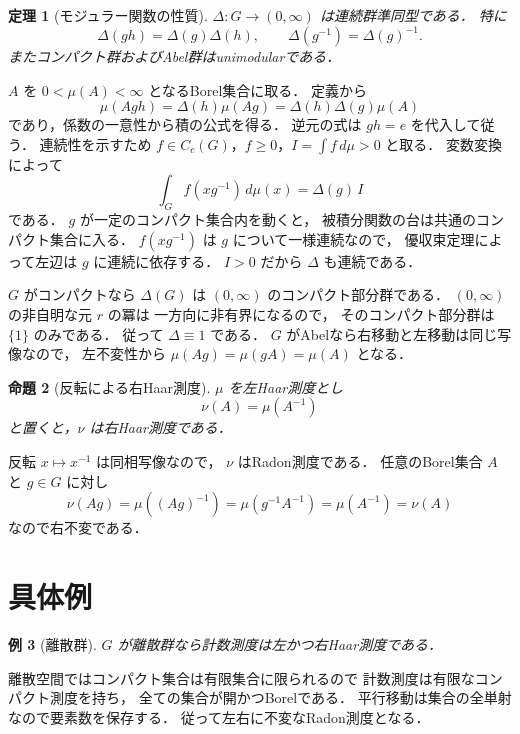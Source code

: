 \documentclass[a5paper,10pt,onecolumn]{jsarticle}
\makeatletter
\theoremstyle{mathnotetheorem}
\newtheorem{theorem}{定理}[section]
\newtheorem{proposition}[theorem]{命題}
\newtheorem{example}[theorem]{例}
\renewcommand{\proofname}{証明}
\renewenvironment{proof}[1][\proofname]{%
  \par\pushQED{\qed}\normalfont\topsep4\p@\@plus2\p@\relax
  \trivlist\item[\hskip\labelsep\bfseries #1]\ignorespaces
}{\popQED\endtrivlist\@endpefalse}
\makeatother
\begin{document}
\begin{theorem}[モジュラー関数の性質]\label{thm:modular}
$\Delta:G\to(0,\infty)$ は連続群準同型である．
特に
\[
 \Delta(gh)=\Delta(g)\Delta(h),\qquad
 \Delta(g^{-1})=\Delta(g)^{-1}.
\]
またコンパクト群およびAbel群はunimodularである．
\end{theorem}
\begin{proof}
$A$ を $0<\mu(A)<\infty$ となるBorel集合に取る．
定義から
\[
 \mu(Agh)=\Delta(h)\mu(Ag)
 =\Delta(h)\Delta(g)\mu(A)
\]
であり，係数の一意性から積の公式を得る．
逆元の式は $gh=e$ を代入して従う．
連続性を示すため
$f\in C_c(G)$，$f\ge0$，$I=\int f\,d\mu>0$ と取る．
変数変換によって
\[
 \int_G f(xg^{-1})\,d\mu(x)=\Delta(g)\,I
\]
である．
$g$ が一定のコンパクト集合内を動くと，
被積分関数の台は共通のコンパクト集合に入る．
$f(xg^{-1})$ は $g$ について一様連続なので，
優収束定理によって左辺は $g$ に連続に依存する．
$I>0$ だから $\Delta$ も連続である．

$G$ がコンパクトなら $\Delta(G)$ は
$(0,\infty)$ のコンパクト部分群である．
$(0,\infty)$ の非自明な元 $r$ の冪は
一方向に非有界になるので，
そのコンパクト部分群は $\{1\}$ のみである．
従って $\Delta\equiv1$ である．
$G$ がAbelなら右移動と左移動は同じ写像なので，
左不変性から $\mu(Ag)=\mu(gA)=\mu(A)$ となる．
\end{proof}

\begin{proposition}[反転による右Haar測度]\label{prop:right}
$\mu$ を左Haar測度とし
\[
 \nu(A)=\mu(A^{-1})
\]
と置くと，$\nu$ は右Haar測度である．
\end{proposition}
\begin{proof}
反転 $x\mapsto x^{-1}$ は同相写像なので，
$\nu$ はRadon測度である．
任意のBorel集合 $A$ と $g\in G$ に対し
\[
 \nu(Ag)=\mu((Ag)^{-1})
 =\mu(g^{-1}A^{-1})=\mu(A^{-1})=\nu(A)
\]
なので右不変である．
\end{proof}

\section{具体例}

\begin{example}[離散群]
$G$ が離散群なら計数測度は左かつ右Haar測度である．
\end{example}
\begin{proof}
離散空間ではコンパクト集合は有限集合に限られるので
計数測度は有限なコンパクト測度を持ち，
全ての集合が開かつBorelである．
平行移動は集合の全単射なので要素数を保存する．
従って左右に不変なRadon測度となる．
\end{proof}
\end{document}
